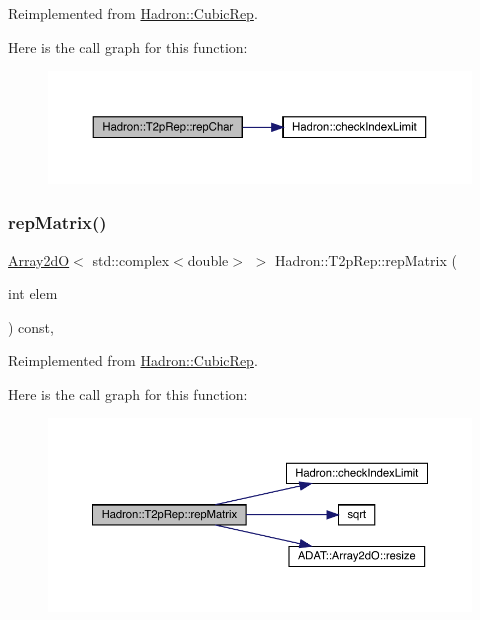 Reimplemented from \mbox{\hyperlink{structHadron_1_1CubicRep_af45227106e8e715e84b0af69cd3b36f8}{Hadron\+::\+Cubic\+Rep}}.

Here is the call graph for this function\+:
\nopagebreak
\begin{figure}[H]
\begin{center}
\leavevmode
\includegraphics[width=350pt]{d8/d6b/structHadron_1_1T2pRep_a42f3c130c87e354a8453c53cdb66e1a5_cgraph}
\end{center}
\end{figure}
\mbox{\label{structHadron_1_1T2pRep_a9800949d2a6f8dcd4dd356947cae0488}} 
\subsubsection{\texorpdfstring{repMatrix()}{repMatrix()}\hspace{0.1cm}{\footnotesize\ttfamily [1/2]}}
{\footnotesize\ttfamily \mbox{\hyperlink{classADAT_1_1Array2dO}{Array2dO}}$<$ std\+::complex$<$double$>$ $>$ Hadron\+::\+T2p\+Rep\+::rep\+Matrix (\begin{DoxyParamCaption}\item[{int}]{elem }\end{DoxyParamCaption}) const\hspace{0.3cm}{\ttfamily [inline]}, {\ttfamily [virtual]}}



Reimplemented from \mbox{\hyperlink{structHadron_1_1CubicRep_ac5d7e9e6f4ab1158b5fce3e4ad9e8005}{Hadron\+::\+Cubic\+Rep}}.

Here is the call graph for this function\+:
\nopagebreak
\begin{figure}[H]
\begin{center}
\leavevmode
\includegraphics[width=350pt]{d8/d6b/structHadron_1_1T2pRep_a9800949d2a6f8dcd4dd356947cae0488_cgraph}
\end{center}
\end{figure}
\mbox{\label{structHadron_1_1T2pRep_a9800949d2a6f8dcd4dd356947cae0488}} 
